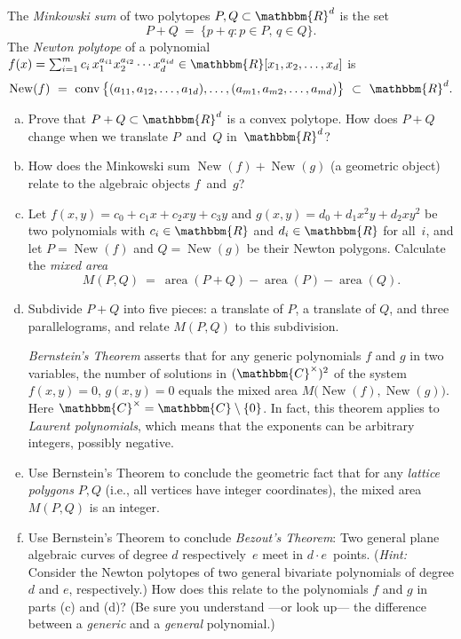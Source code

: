 \documentclass[11pt]{amsart}
\DeclareMathOperator{\conv}{conv}
\DeclareMathOperator{\New}{New}
\DeclareMathOperator{\area}{area}
\newcommand{\RR}{\mathbbm{R}}
\newcommand{\CC}{\mathbbm{C}}
\begin{document}
The \emph{Minkowski sum} of two polytopes $P,Q\subset\RR^d$ is the set
\[
   P + Q
   \ = \
   \big\{p+q : p\in P,\,q\in Q\}.
\]
The \emph{Newton polytope} of a polynomial $f(x)=\sum_{i=1}^m c_i \, x_1^{a_{i1}}x_2^{a_{i2}}\cdots x_d^{a_{id}} \in \RR[x_1,x_2,\dots,x_d]$ is 
\[
   \New(f)
   \ = \
   \conv\big\{(a_{11},a_{12},\dots,a_{1d}),\dots,(a_{m1},a_{m2},\dots,a_{md})\big\}
   \ \subset \
   \RR^d.
\]
\begin{enumerate}[(a)]
\item Prove that $P+Q\subset\RR^d$ is a convex polytope. How does $P+Q$ change when we translate $P$~and~$Q$ in~$\RR^d$?

\item How does the Minkowski sum $\New(f)+\New(g)$ (a geometric object) relate to the algebraic objects $f$~and~$g$?  

\item Let $f(x,y)=c_0 + c_1 x + c_2 xy + c_3 y$ and $g(x,y) = d_0 + d_1 x^2y + d_2 xy^2$ be two polynomials with $c_i\in\RR$ and $d_i\in\RR$ for all~$i$, and let $P=\New(f)$ and $Q=\New(g)$ be their Newton polygons. Calculate the \emph{mixed area}
\[
  M(P,Q)
  \ = \
  \area(P+Q) - \area(P) - \area(Q).
\]

\item Subdivide $P+Q$ into five pieces: a translate of $P$, a translate of $Q$, and three parallelograms, and relate $M(P,Q)$ to this subdivision.

\medskip
\emph{Bernstein's Theorem} asserts that for any generic polynomials $f$ and $g$ in two variables, the number of solutions in $(\CC^\times)^2$ of the system $f(x,y)=0$, $g(x,y)=0$ equals the mixed area $M\big(\New(f),\New(g)\big)$. Here $\CC^\times = \CC\setminus\{0\}$. In fact, this theorem applies to \emph{Laurent polynomials}, which means that the exponents can be arbitrary integers, possibly negative. 

\medskip
\item Use Bernstein's Theorem to conclude the geometric fact that for any \emph{lattice polygons} $P,Q$ (i.e., all vertices have integer coordinates), the mixed area $M(P,Q)$ is an integer.

\item Use Bernstein's Theorem to conclude \emph{Bezout's Theorem}: Two general plane algebraic curves of degree $d$ respectively~$e$ meet in $d\cdot e$~points. (\emph{Hint:} Consider the Newton polytopes of two general bivariate polynomials of degree $d$ and $e$, respectively.) How does this relate to the polynomials $f$ and $g$ in parts (c) and (d)? (Be sure you understand ---or look up--- the difference between a \emph{generic} and a \emph{general} polynomial.)
\end{enumerate}
\end{document}
